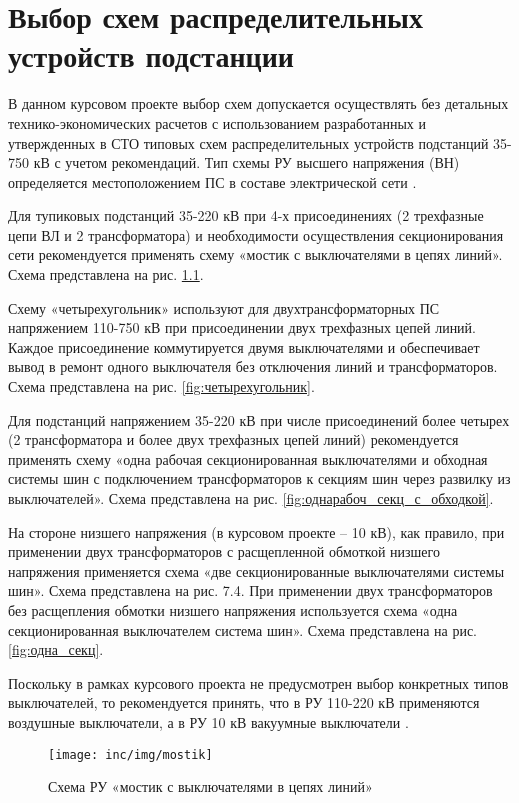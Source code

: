\chapter{Выбор схем распределительных устройств подстанции}
\label{cha:vybor-scheme_ru}

В данном курсовом проекте выбор схем допускается осуществлять без детальных технико-экономических расчетов с использованием разработанных и утвержденных в СТО \cite{СТО_принципиальных_схем} типовых схем распределительных устройств подстанций 35-750 кВ с учетом рекомендаций. Тип схемы РУ высшего напряжения (ВН) определяется местоположением ПС в составе электрической сети \cite{глазунов_шведов}.

Для тупиковых подстанций 35-220 кВ при 4-х присоединениях (2 трехфазные цепи ВЛ и 2 трансформатора) и необходимости осуществления секционирования сети рекомендуется применять схему «мостик с выключателями в цепях линий». Схема представлена на рис. \ref{fig:мостик}.

Схему «четырехугольник» используют для двухтрансформаторных ПС напряжением 110-750 кВ при присоединении двух трехфазных цепей линий. Каждое присоединение коммутируется двумя выключателями и обеспечивает вывод в ремонт одного выключателя без отключения линий и трансформаторов. Схема представлена на рис. \ref{fig:четырехугольник}.

Для подстанций напряжением 35-220 кВ при числе присоединений более четырех (2 трансформатора и более двух трехфазных цепей линий) рекомендуется применять схему «одна рабочая секционированная выключателями и обходная системы шин с подключением трансформаторов к секциям шин через развилку из выключателей». Схема представлена на рис. \ref{fig:однарабоч_секц_с_обходкой}. 

На стороне низшего напряжения (в курсовом проекте – 10 кВ), как правило, при применении двух трансформаторов с расщепленной обмоткой низшего напряжения применяется схема «две секционированные выключателями системы шин». Схема представлена на рис. 7.4. При применении двух трансформаторов без расщепления обмотки низшего напряжения используется схема «одна секционированная выключателем система шин». Схема представлена на рис. \ref{fig:одна_секц}.

Поскольку в рамках курсового проекта не предусмотрен выбор конкретных типов выключателей, то рекомендуется принять, что в РУ 110-220 кВ применяются воздушные выключатели, а в РУ 10 кВ вакуумные выключатели \cite{глазунов_шведов}.

\begin{figure}[ht]
	\centering
	\texttt{[image: inc/img/mostik]}
	\caption{Схема РУ «мостик с выключателями в цепях линий»}
	\label{fig:мостик}
\end{figure}

